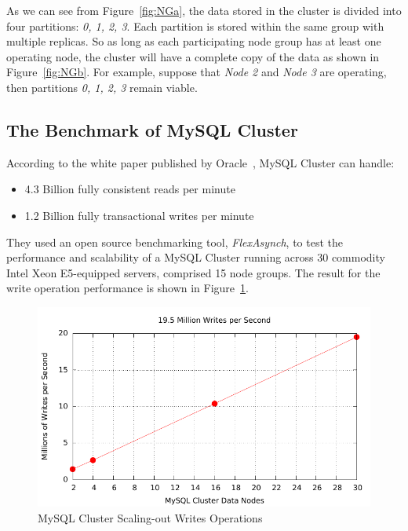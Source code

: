 \noindent As we can see from Figure~\ref{fig:NGa}, the data stored in the cluster is divided into four partitions: \textit{0, 1, 2, 3}. Each partition is stored within the same group with multiple replicas. So as long as each participating node group has at least one operating node, the cluster will have a complete copy of the data as shown in Figure~\ref{fig:NGb}. For example, suppose that \textit{Node 2} and\textit{ Node 3} are operating, then partitions \textit{0, 1, 2, 3} remain viable.

\subsection{The Benchmark of MySQL Cluster}
According to the white paper published by Oracle~\cite{mysqlclusterwhitepaper}, MySQL Cluster can handle:
\begin{itemize}[noitemsep]
	\item 4.3 Billion fully consistent reads per minute
	\item 1.2 Billion fully transactional writes per minute
\end{itemize}

\noindent They used an open source benchmarking tool, \textit{FlexAsynch}, to test the performance and scalability of a MySQL Cluster running across 30 commodity Intel Xeon E5-equipped servers, comprised 15 node groups. The result for the write operation performance is shown in Figure~\ref{fig:mysqlwrite}.

\begin{figure}[h!]
	\centering
	\includegraphics[scale=1]{figs/mysqlclusterbenchmark.pdf}
	\caption{MySQL Cluster Scaling-out Writes Operations}
	\label{fig:mysqlwrite}
\end{figure}

